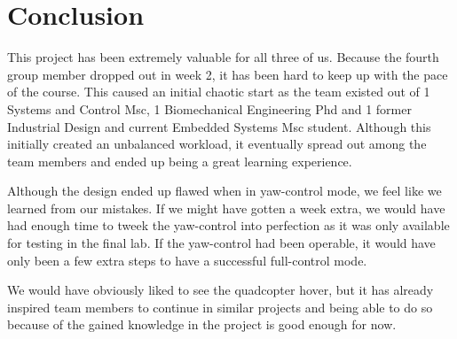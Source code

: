 \documentclass{article}
\begin{document}

\section{Conclusion}
\label{sec:conclusion}

This project has been extremely valuable for all three of us. Because the fourth group member dropped out in week 2, it has been hard to keep up with the pace of the course. This caused an initial chaotic start as the team existed out of 1 Systems and Control Msc, 1 Biomechanical Engineering Phd and 1 former Industrial Design and current Embedded Systems Msc student. Although this initially created an unbalanced workload, it eventually spread out among the team members and ended up being a great learning experience. 

Although the design ended up flawed when in yaw-control mode, we feel like we learned from our mistakes. If we might have gotten a week extra, we would have had enough time to tweek the yaw-control into perfection as it was only available for testing in the final lab. If the yaw-control had been operable, it would have only been a few extra steps to have a successful full-control mode. 

We would have obviously liked to see the quadcopter hover, but it has already inspired team members to continue in similar projects and being able to do so because of the gained knowledge in the project is good enough for now. 



%




%
%
\end{document}
